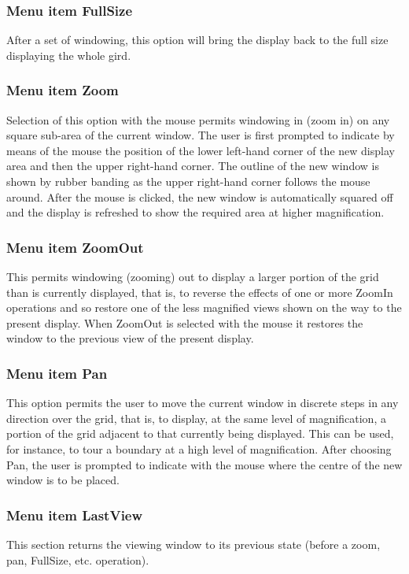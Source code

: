 \documentclass{article}
\begin{document}
\subsubsection{Menu item FullSize}
After a set of windowing, this option will bring the display back to the full size displaying the whole gird.

\subsubsection{Menu item Zoom}
Selection of this option with the mouse permits windowing in (zoom in) on any square sub-area of the current window. The user is first prompted to indicate by means of the mouse the position of the lower left-hand corner of the new display area and then the upper right-hand corner. The outline of the new window is shown by rubber banding as the upper right-hand corner follows the mouse around. After the mouse is clicked, the new window is automatically squared off and the display is refreshed to show the required area at higher magnification.

\subsubsection{Menu item ZoomOut}
This permits windowing (zooming) out to display a larger portion of the grid than is currently displayed, that is, to reverse the effects of one or more ZoomIn operations and so restore one of the less magnified views shown on the way to the present display. When ZoomOut is selected with the mouse it restores the window to the previous view of the present display.

\subsubsection{Menu item Pan}
This option permits the user to move the current window in discrete steps in any direction over the grid, that is, to display, at the same level of magnification, a portion of the grid adjacent to that currently being displayed. This can be used, for instance, to tour a boundary at a high level of magnification. After choosing Pan, the user is prompted to indicate with the mouse where the centre of the new window is to be placed. 

\subsubsection{Menu item LastView}
This section returns the viewing window to its previous state (before a zoom, pan, FullSize, etc. operation).
\end{document}

